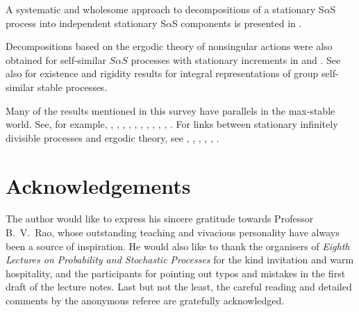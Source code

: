 \documentclass[12pt]{amsart}
\begin{document}
A systematic and wholesome approach to decompositions of a stationary S$\alpha$S process into independent stationary S$\alpha$S components is presented in \cite{wang:stoev:roy:2012}.

Decompositions based on the ergodic theory of nonsingular actions were also obtained for self-similar $S\alpha S$ processes with stationary
increments in \cite{pipiras:taqqu:2002a} and \cite{pipiras:taqqu:2002b}. See also \cite{kolodynski:rosinski:2003} for existence and rigidity results for integral representations of group self-similar stable processes.

Many of the results mentioned in this survey have parallels in the max-stable world. See, for example, \cite{stoev:taqqu:2005}, \cite{stoev:2008}, \cite{kabluchko:2009}, \cite{kabluchko:schlather:dehaan:2009}, \cite{kabluchko:schlather:2010}, \cite{wang:stoev:2010a}, \cite{wang:stoev:2010b}, \cite{wang:stoev:roy:2012}, \cite{wang:roy:stoev:2013}, \cite{dombry:kabluchko:2014}, \cite{dombry:kabluchko:2016}. For links between stationary infinitely divisible processes and ergodic theory, see \cite{roy:2007a}, \cite{roy:2009}, \cite{owada:samorodnitsky:2015b}, \cite{jung:owada:samorodnitsky:2015}, \cite{owada:2016}, \cite{kabluchko:stoev:2016}.

\section*{Acknowledgements} The author would like to express his sincere gratitude towards Professor B.~V.~Rao, whose outstanding teaching and vivacious personality have always been a source of inspiration. He would also like to thank the organisers of \emph{Eighth Lectures on Probability and Stochastic Processes} for the kind invitation and warm hospitality, and the participants for pointing out typos and mistakes in the first draft of the lecture notes. Last but not the least, the careful reading and detailed comments by the anonymous referee are gratefully acknowledged. 
\end{document}
